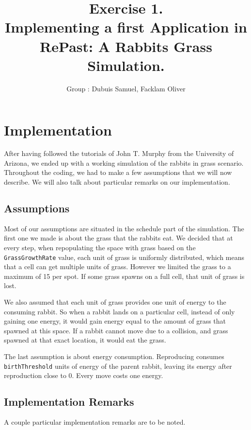 \documentclass[11pt]{article}
\title{\bf Exercise 1.\\ Implementing a first Application in RePast: A Rabbits Grass Simulation.}
\author{Group \textnumero 22: Dubuis Samuel, Facklam Oliver}
\begin{document}
\maketitle

\section{Implementation}
After having followed the tutorials of John T. Murphy from the University of Arizona, we ended up with a working simulation of the rabbits in grass scenario.
Throughout the coding, we had to make a few assumptions that we will now describe. We will also talk about particular remarks on our implementation.

\subsection{Assumptions}

Most of our assumptions are situated in the schedule part of the simulation. The first one we made is about the grass that the rabbits eat. We decided that at every step, when repopulating the space with grass based on the \texttt{GrassGrowthRate} value, each unit of grass is uniformly distributed, which means that a cell can get multiple units of grass. However we limited the grass to a maximum of 15 per spot. If some grass spawns on a full cell, that unit of grass is lost.

We also assumed that each unit of grass provides one unit of energy to the consuming rabbit. So when a rabbit lands on a particular cell, instead of only gaining one energy, it would gain energy equal to the amount of grass that spawned at this space. If a rabbit cannot move due to a collision, and grass spawned at that exact location, it would eat the grass.

The last assumption is about energy consumption. Reproducing consumes \texttt{birthThreshold} units of energy of the parent rabbit, leaving its energy after reproduction close to 0. Every move costs one energy.

\subsection{Implementation Remarks}
A couple particular implementation remarks are to be noted.
\end{document}
